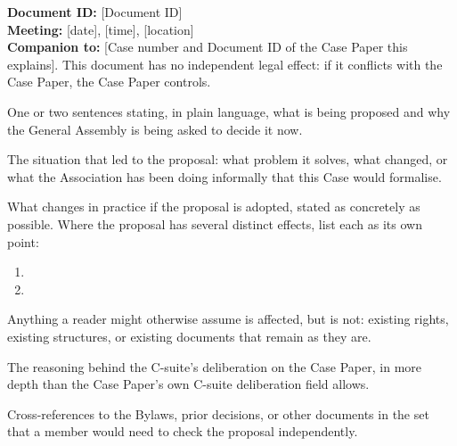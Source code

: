 \documentclass{../../Common/Latex/Templates/rapport}
\newcommand{\meetingline}{\textbf{Meeting:} [date], [time], [location]}
\begin{document}
\reportmainmatter

\noindent\textbf{Document ID:} [Document ID]\\
\meetingline\\
\textbf{Companion to:} [Case number and Document ID of the Case Paper this explains]. This document has no independent legal effect: if it conflicts with the Case Paper, the Case Paper controls.

One or two sentences stating, in plain language, what is being proposed and why the General Assembly is being asked to decide it now.

The situation that led to the proposal: what problem it solves, what changed, or what the Association has been doing informally that this Case would formalise.

What changes in practice if the proposal is adopted, stated as concretely as possible. Where the proposal has several distinct effects, list each as its own point:
\begin{enumerate}[label=\arabic*.]
  \item [First effect.]
  \item [Second effect.]
\end{enumerate}

Anything a reader might otherwise assume is affected, but is not: existing rights, existing structures, or existing documents that remain as they are.

The reasoning behind the C-suite's deliberation on the Case Paper, in more depth than the Case Paper's own C-suite deliberation field allows.

Cross-references to the Bylaws, prior decisions, or other documents in the set that a member would need to check the proposal independently.
\end{document}
